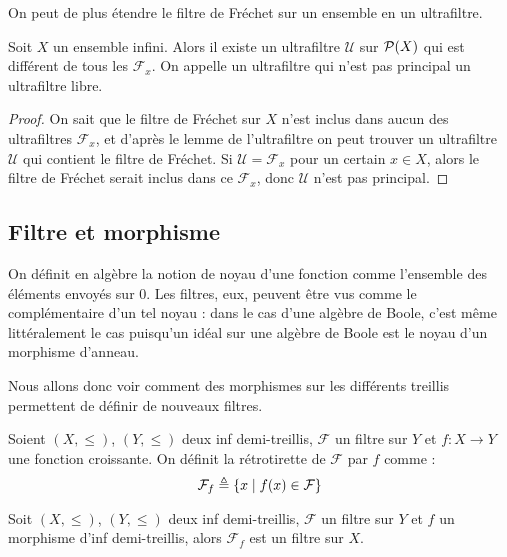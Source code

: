 On peut de plus étendre le filtre de Fréchet sur un ensemble en un ultrafiltre.

\begin{proposition}
  Soit $X$ un ensemble infini. Alors il existe un ultrafiltre $\mathcal U$ sur
  $\mathcal{P}(X)$ qui est différent de tous les $\mathcal F_x$. On appelle un
  ultrafiltre qui n'est pas principal un ultrafiltre libre.
\end{proposition}

\begin{proof}
  On sait que le filtre de Fréchet sur $X$ n'est inclus dans aucun des
  ultrafiltres $\mathcal F_x$, et d'après le lemme de l'ultrafiltre on peut
  trouver un ultrafiltre $\mathcal U$ qui contient le filtre de Fréchet. Si
  $\mathcal U = \mathcal F_x$ pour un certain $x\in X$, alors le filtre de
  Fréchet serait inclus dans ce $\mathcal F_x$, donc $\mathcal U$ n'est pas
  principal.
\end{proof}

\subsection{Filtre et morphisme}

On définit en algèbre la notion de noyau d'une fonction comme l'ensemble des
éléments envoyés sur $0$. Les filtres, eux, peuvent être vus comme le
complémentaire d'un tel noyau : dans le cas d'une algèbre de Boole, c'est même
littéralement le cas puisqu'un idéal sur une algèbre de Boole est le noyau d'un
morphisme d'anneau.

Nous allons donc voir comment des morphismes sur les différents treillis
permettent de définir de nouveaux filtres.

\begin{definition}
  Soient $(X,\leq)$, $(Y,\leq)$ deux inf demi-treillis, $\mathcal F$ un filtre
  sur $Y$ et $f : X \to Y$ une fonction croissante. On définit la rétrotirette
  de $\mathcal F$ par $f$ comme :
  \[\mathcal F_f \triangleq \{x\mid f(x) \in \mathcal F\}\]
\end{definition}

\begin{property}
  Soit $(X,\leq)$, $(Y,\leq)$ deux inf demi-treillis, $\mathcal F$ un filtre
  sur $Y$ et $f$ un morphisme d'inf demi-treillis, alors $\mathcal F_f$ est un
  filtre sur $X$.
\end{property}


